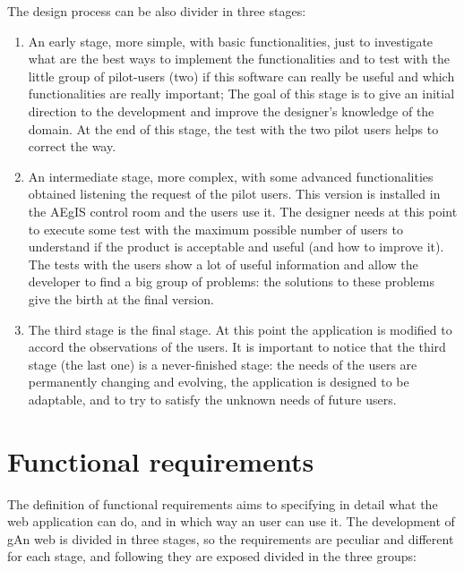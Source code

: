 The design process can be also divider in three stages:

\begin{enumerate}

\item An early stage, more simple, with basic functionalities, just to investigate what are the best ways to implement the functionalities and to test with the little group of pilot-users (two) if this software can really be useful and which functionalities are really important; The goal of this stage is to give an initial direction to the development and improve the designer's knowledge of the domain. At the end of this stage, the test with the two pilot users helps to correct the way.

\item An intermediate stage, more complex, with some advanced functionalities obtained listening the request of the pilot users. This version is installed in the AEgIS control room and the users use it. 
The designer needs at this point to execute some test with the maximum possible number of users to understand if the product is acceptable and useful (and how to improve it). 
The tests with the users show a lot of useful information and allow the developer to find a big group of problems: the solutions to these problems give the birth at the final version. 

\item
The third stage is the final stage. At this point the application is modified to accord the observations of the users. It is important to notice that the third stage (the last one) is a never-finished stage: the needs of the users are permanently changing and evolving, the application is designed to be adaptable, and to try to satisfy the unknown needs of future users.

\end{enumerate}

\section{Functional requirements}
The definition of functional requirements aims to specifying in detail what the web application can do, and in which way an user can use it. The development of gAn web is divided in three stages, so the requirements are peculiar and different for each stage, and following they are exposed divided in the three groups: 

